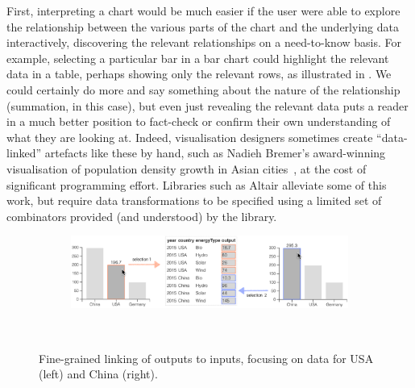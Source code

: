 First, interpreting a chart would be much easier if the user were able to explore the relationship between the various parts of the chart and the underlying data interactively, discovering the relevant relationships on a need-to-know basis. For example, selecting a particular bar in a bar chart could highlight the relevant data in a table, perhaps showing only the relevant rows, as illustrated in . We could certainly do more and say something about the nature of the relationship (summation, in this case), but even just revealing the relevant data puts a reader in a much better position to fact-check or confirm their own understanding of what they are looking at. Indeed, visualisation designers sometimes create ``data-linked'' artefacts like these by hand, such as Nadieh Bremer's award-winning visualisation of population density growth in Asian cities~\cite{bremer15}, at the cost of significant programming effort. Libraries such as Altair \cite{vanderPlas18} alleviate some of this work, but require data transformations to be specified using a limited set of combinators provided (and understood) by the library.

\begin{figure}
   \begin{subfigure}[b]{0.99\textwidth}
      \centering
      {\includegraphics[scale=0.55]{fig/example/data-linking-merged.png}}
   \end{subfigure}\\
   \vspace{2mm}
   \begin{subfigure}{0.65\textwidth}
      \small
      
   \end{subfigure}
   \caption{Fine-grained linking of outputs to inputs, focusing on data for USA (left) and China (right).}
   \label{fig:introduction:data-linking}
\end{figure}

